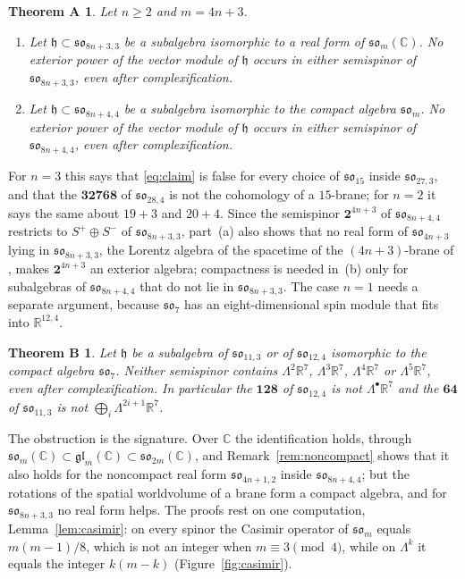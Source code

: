 \documentclass[11pt]{amsart}
\newtheorem*{theoremA}{Theorem A}
\newtheorem*{theoremB}{Theorem B}
\theoremstyle{remark}
\newcommand{\so}{\mathfrak{so}}
\newcommand{\h}{\mathfrak{h}}
\newcommand{\R}{\mathbb{R}}
\newcommand{\C}{\mathbb{C}}
\begin{document}
\begin{theoremA}
Let $n\ge 2$ and $m=4n+3$.
\begin{enumerate}
\item[(a)] Let $\h\subset\so_{8n+3,3}$ be a subalgebra isomorphic to a real form of $\so_m(\C)$. No exterior power of the vector module of $\h$ occurs in either semispinor of $\so_{8n+3,3}$, even after complexification.
\item[(b)] Let $\h\subset\so_{8n+4,4}$ be a subalgebra isomorphic to the compact algebra $\so_m$. No exterior power of the vector module of $\h$ occurs in either semispinor of $\so_{8n+4,4}$, even after complexification.
\end{enumerate}
\end{theoremA}

For $n=3$ this says that \eqref{eq:claim} is false for every choice of $\so_{15}$ inside $\so_{27,3}$, and that the $\mathbf{32768}$ of $\so_{28,4}$ is not the cohomology of a $15$-brane; for $n=2$ it says the same about $19+3$ and $20+4$. Since the semispinor $\mathbf{2}^{4n+3}$ of $\so_{8n+4,4}$ restricts to $S^+\oplus S^-$ of $\so_{8n+3,3}$, part~(a) also shows that no real form of $\so_{4n+3}$ lying in $\so_{8n+3,3}$, the Lorentz algebra of the spacetime of the $(4n+3)$-brane of \cite[(3.8)]{RMC20}, makes $\mathbf{2}^{4n+3}$ an exterior algebra; compactness is needed in~(b) only for subalgebras of $\so_{8n+4,4}$ that do not lie in $\so_{8n+3,3}$. The case $n=1$ needs a separate argument, because $\so_7$ has an eight-dimensional spin module that fits into $\R^{12,4}$.

\begin{theoremB}
Let $\h$ be a subalgebra of $\so_{11,3}$ or of $\so_{12,4}$ isomorphic to the compact algebra $\so_7$. Neither semispinor contains $\Lambda^2\R^7$, $\Lambda^3\R^7$, $\Lambda^4\R^7$ or $\Lambda^5\R^7$, even after complexification. In particular the $\mathbf{128}$ of $\so_{12,4}$ is not $\Lambda^\bullet\R^7$ and the $\mathbf{64}$ of $\so_{11,3}$ is not $\bigoplus_i\Lambda^{2i+1}\R^7$.
\end{theoremB}

The obstruction is the signature. Over $\C$ the identification holds, through $\so_m(\C)\subset\mathfrak{gl}_m(\C)\subset\so_{2m}(\C)$, and Remark~\ref{rem:noncompact} shows that it also holds for the noncompact real form $\so_{4n+1,2}$ inside $\so_{8n+4,4}$; but the rotations of the spatial worldvolume of a brane form a compact algebra, and for $\so_{8n+3,3}$ no real form helps. The proofs rest on one computation, Lemma~\ref{lem:casimir}: on every spinor the Casimir operator of $\so_m$ equals $m(m-1)/8$, which is not an integer when $m\equiv 3\pmod 4$, while on $\Lambda^k$ it equals the integer $k(m-k)$ (Figure~\ref{fig:casimir}).
\end{document}
